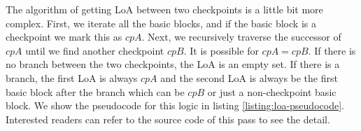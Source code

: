 The algorithm of getting LoA between two checkpoints is a little bit more
complex. First, we iterate all the basic blocks, and if the basic block is a
checkpoint we mark this as $cpA$. Next, we recursively traverse the successor of
$cpA$ until we find another checkpoint $cpB$. It is possible for $cpA = cpB$. If
there is no branch between the two checkpoints, the LoA is an empty set. If
there is a branch, the first LoA is always $cpA$ and the second LoA is always be
the first basic block after the branch \textemdash{} which can be $cpB$ or just
a non-checkpoint basic block. We show the pseudocode for this logic in listing
\ref{listing:loa-pseudocode}.  Interested readers can refer to the source code
of this pass to see the detail.
